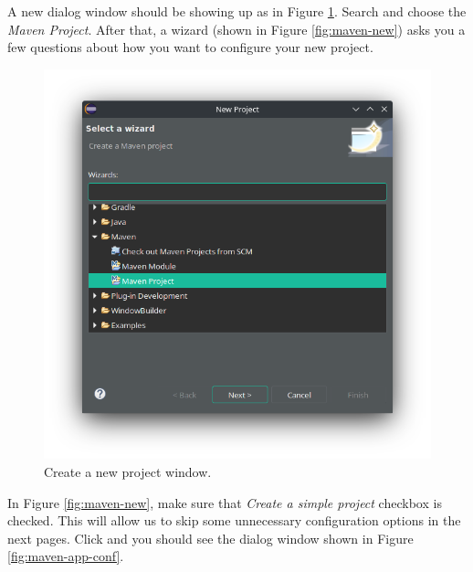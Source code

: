 A new dialog window should be showing up as in Figure \ref{fig:eclipse-project}. Search and choose the \emph{Maven Project}. After that, a wizard (shown in Figure \ref{fig:maven-new}) asks you a few questions about how you want to configure your new project.

\begin{figure}[H]
    \centering
    \includegraphics[width=\textwidth]{images/eclipse-project.png}
    \caption{Create a new project window.}
    \label{fig:eclipse-project}
\end{figure}

In Figure \ref{fig:maven-new}, make sure that \emph{Create a simple project} checkbox is checked. This will allow us to skip some unnecessary configuration options in the next pages. Click  and you should see the dialog window shown in Figure \ref{fig:maven-app-conf}.

